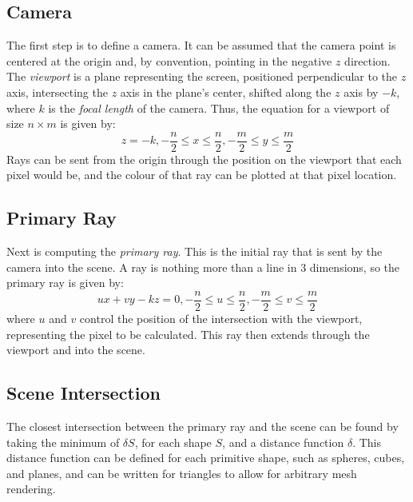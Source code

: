 \documentclass{article}
\begin{document}
    \subsection{Camera}
        The first step is to define a camera. It can be assumed that the camera point is centered at
        the origin and, by convention, pointing in the negative $z$ direction. The \emph{viewport} is a
        plane representing the screen, positioned perpendicular to the $z$ axis, intersecting the $z$
        axis in the plane's center, shifted along the $z$ axis by $-k$, where $k$ is the
        \emph{focal length} of the camera. Thus, the equation for a viewport of size $n\times m$ is
        given by:
        \begin{equation*}
            z = -k, -\frac{n}{2} \leq x \leq \frac{n}{2}, -\frac{m}{2} \leq y \leq \frac{m}{2}
        \end{equation*}
        Rays can be sent from the origin through the position on the viewport that each pixel would be,
        and the colour of that ray can be plotted at that pixel location.

    \subsection{Primary Ray}
        Next is computing the \emph{primary ray}. This is the initial ray that is sent by the camera
        into the scene. A ray is nothing more than a line in 3 dimensions, so the primary ray is given
        by:
        \begin{equation*}
            ux + vy - kz = 0, -\frac{n}{2} \leq u \leq \frac{n}{2}, -\frac{m}{2} \leq v \leq \frac{m}{2}
        \end{equation*}
        where $u$ and $v$ control the position of the intersection with the viewport, representing the
        pixel to be calculated. This ray then extends through the viewport and into the scene.

    \subsection{Scene Intersection}
        The closest intersection between the primary ray and the scene can be found by taking the
        minimum of $\delta S$, for each shape $S$, and a distance function $\delta$. This distance
        function can be defined for each primitive shape, such as spheres, cubes, and planes, and
        can be written for triangles to allow for arbitrary mesh rendering.
\end{document}
